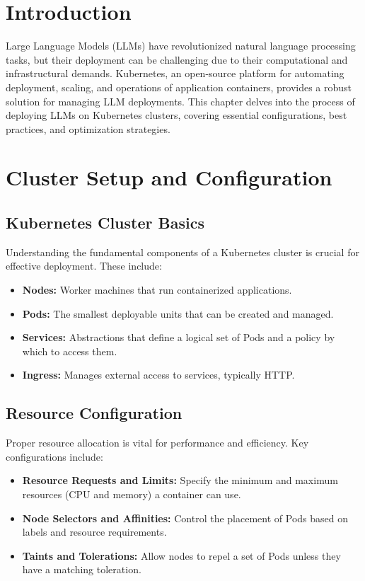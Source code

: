 \section{Introduction}
Large Language Models (LLMs) have revolutionized natural language processing tasks, but their deployment can be challenging due to their computational and infrastructural demands. Kubernetes, an open-source platform for automating deployment, scaling, and operations of application containers, provides a robust solution for managing LLM deployments. This chapter delves into the process of deploying LLMs on Kubernetes clusters, covering essential configurations, best practices, and optimization strategies.

\section{Cluster Setup and Configuration}

\subsection{Kubernetes Cluster Basics}
Understanding the fundamental components of a Kubernetes cluster is crucial for effective deployment. These include:
\begin{itemize}
    \item \textbf{Nodes:} Worker machines that run containerized applications.
    \item \textbf{Pods:} The smallest deployable units that can be created and managed.
    \item \textbf{Services:} Abstractions that define a logical set of Pods and a policy by which to access them.
    \item \textbf{Ingress:} Manages external access to services, typically HTTP.
\end{itemize}

\subsection{Resource Configuration}
Proper resource allocation is vital for performance and efficiency. Key configurations include:
\begin{itemize}
    \item \textbf{Resource Requests and Limits:} Specify the minimum and maximum resources (CPU and memory) a container can use.
    \item \textbf{Node Selectors and Affinities:} Control the placement of Pods based on labels and resource requirements.
    \item \textbf{Taints and Tolerations:} Allow nodes to repel a set of Pods unless they have a matching toleration.
\end{itemize}

